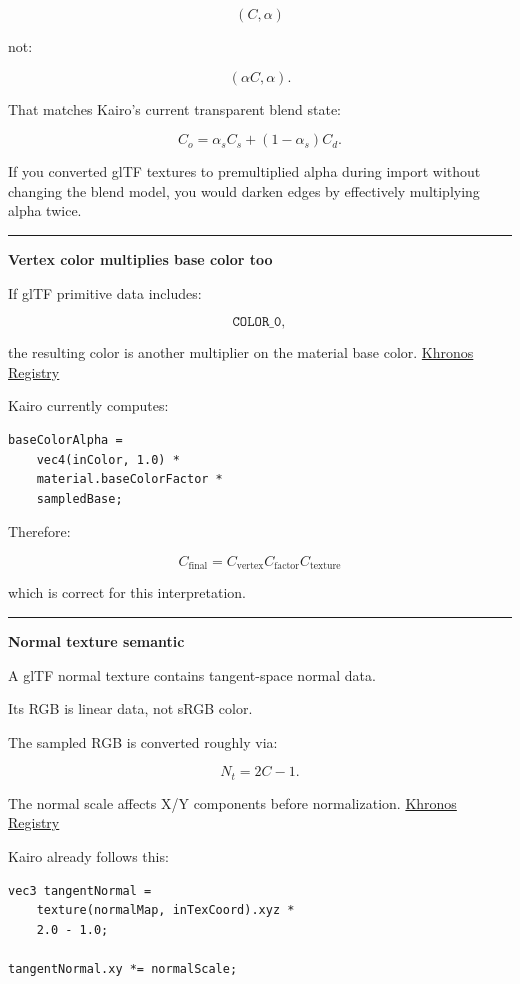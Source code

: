 \[
(C,\alpha)
\]

not:

\[
(\alpha C,\alpha).
\]

That matches Kairo's current transparent blend state:

\[
C_o
=
\alpha_sC_s+
(1-\alpha_s)C_d.
\]

If you converted glTF textures to premultiplied alpha during import without changing the blend model, you would darken edges by effectively multiplying alpha twice.

\begin{center}\rule{0.5\linewidth}{0.5pt}\end{center}

\textbf{Vertex color multiplies base color too}

If glTF primitive data includes:

\[
\texttt{COLOR\_0},
\]

the resulting color is another multiplier on the material base color. \href{https://registry.khronos.org/glTF/specs/2.0/glTF-2.0.html?utm_source=chatgpt.com}{Khronos Registry}

Kairo currently computes:

\begin{verbatim}
baseColorAlpha =
    vec4(inColor, 1.0) *
    material.baseColorFactor *
    sampledBase;
\end{verbatim}

Therefore:

\[
\boxed{
C_{\text{final}}
=
C_{\text{vertex}}
C_{\text{factor}}
C_{\text{texture}}
}
\]

which is correct for this interpretation.

\begin{center}\rule{0.5\linewidth}{0.5pt}\end{center}

\textbf{Normal texture semantic}

A glTF normal texture contains tangent-space normal data.

Its RGB is linear data, not sRGB color.

The sampled RGB is converted roughly via:

\[
N_t=2C-1.
\]

The normal scale affects X/Y components before normalization. \href{https://registry.khronos.org/glTF/specs/2.0/glTF-2.0.pdf?utm_source=chatgpt.com}{Khronos Registry}

Kairo already follows this:

\begin{verbatim}
vec3 tangentNormal =
    texture(normalMap, inTexCoord).xyz *
    2.0 - 1.0;

tangentNormal.xy *= normalScale;
\end{verbatim}


